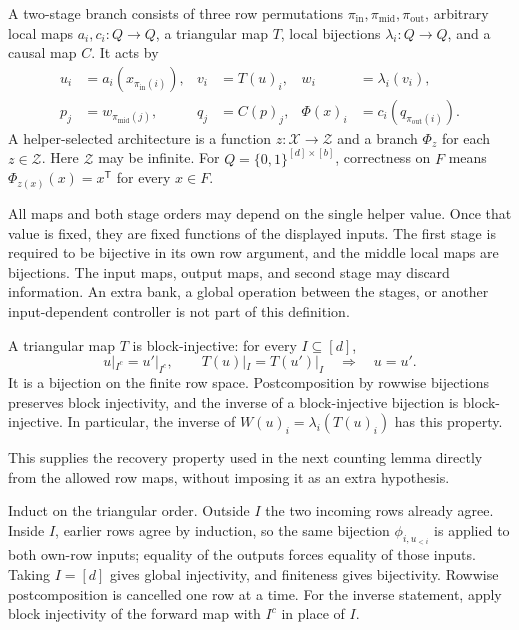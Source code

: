 \begin{definition}\label{def:local-two-stage}
A two-stage branch consists of three row permutations
$\pi_{\mathrm{in}},\pi_{\mathrm{mid}},\pi_{\mathrm{out}}$, arbitrary local
maps $a_i,c_i:Q\to Q$, a triangular map $T$, local bijections
$\lambda_i:Q\to Q$, and a causal map $C$.  It acts by
\begin{align*}
 u_i&=a_i(x_{\pi_{\mathrm{in}}(i)}),&
 v_i&=T(u)_i,& w_i&=\lambda_i(v_i),\\
 p_j&=w_{\pi_{\mathrm{mid}}(j)},&
 q_j&=C(p)_j,& \Phi(x)_i&=c_i(q_{\pi_{\mathrm{out}}(i)}).
\end{align*}
A helper-selected architecture is a function $z:\mathcal X\to\mathcal Z$
and a branch $\Phi_z$ for each $z\in\mathcal Z$.  Here $\mathcal Z$ may be
infinite.  For $Q=\{0,1\}^{[d]\times[b]}$, correctness on $F$ means
$\Phi_{z(x)}(x)=x^{\mathsf T}$ for every $x\in F$.
\end{definition}

All maps and both stage orders may depend on the single helper value.
Once that value is fixed, they are fixed functions of the displayed inputs.
The first stage is required to be bijective in its own row argument, and the
middle local maps are bijections.  The input maps, output maps, and second
stage may discard information.  An extra bank, a global operation between the
stages, or another input-dependent controller is not part of this definition.

\begin{lemma}\label{lem:local-block-injective}
A triangular map $T$ is block-injective: for every $I\subseteq[d]$,
\[
  u|_{I^c}=u'|_{I^c},\qquad T(u)|_I=T(u')|_I
       \quad\Longrightarrow\quad u=u'.
\]
It is a bijection on the finite row space.  Postcomposition by rowwise
bijections preserves block injectivity, and the inverse of a block-injective
bijection is block-injective.  In particular, the inverse of
$W(u)_i=\lambda_i(T(u)_i)$ has this property.
\end{lemma}
This supplies the recovery property used in the next counting lemma directly
from the allowed row maps, without imposing it as an extra hypothesis.
\begin{proofoutline}
Induct on the triangular order.  Outside $I$ the two incoming rows already
agree.  Inside $I$, earlier rows agree by induction, so the same bijection
$\phi_{i,u_{<i}}$ is applied to both own-row inputs; equality of the outputs
forces equality of those inputs.  Taking $I=[d]$ gives global injectivity,
and finiteness gives bijectivity.  Rowwise postcomposition is cancelled one
row at a time.  For the inverse statement, apply block injectivity of the
forward map with $I^c$ in place of $I$.
\end{proofoutline}

